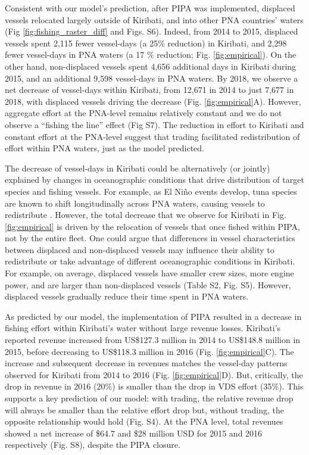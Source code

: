 \documentclass[12pt]{article}
\begin{document}
Consistent with our model's prediction, after PIPA was implemented, displaced vessels relocated largely outside of Kiribati, and into other PNA countries' waters (Fig \ref{fig:fishing_raster_diff} and Figs. S6). Indeed, from 2014 to 2015, displaced vessels spent 2,115 fewer vessel-days (a 25\% reduction) in Kiribati, and 2,298 fewer vessel-days in PNA waters (a 17 \% reduction; Fig. \ref{fig:empirical}). On the other hand, non-displaced vessels spent 4,656 additional days in Kiribati during 2015, and an additional 9,598 vessel-days in PNA waters. By 2018, we observe a net decrease of vessel-days within Kiribati, from 12,671 in 2014 to just 7,677 in 2018, with displaced vessels driving the decrease (Fig. \ref{fig:empirical}A). However, aggregate effort at the PNA-level remains relatively constant and we do not observe a ``fishing the line'' effect (Fig S7). The reduction in effort to Kiribati and constant effort at the PNA-level suggest that trading facilitated redistribution of effort within PNA waters, just as the model predicted.

The decrease of vessel-days in Kiribati could be alternatively (or jointly) explained by changes in oceanographic conditions that drive distribution of target species and fishing vessels. For example, as El Ni\~no events develop, tuna species are known to shift longitudinally across PNA waters, causing vessels to redistribute \cite{aqorau_2018,hanich2018unraveling}. However, the total decrease that we observe for Kiribati in Fig. \ref{fig:empirical} is driven by the relocation of vessels that once fished within PIPA, not by the entire fleet. One could argue that differences in vessel characteristics between displaced and non-displaced vessels may influence their ability to redistribute or take advantage of different oceanographic conditions in Kiribati. For example, on average, displaced vessels have smaller crew sizes, more engine power, and are larger than non-displaced vessels (Table S2, Fig. S5). However, displaced vessels gradually reduce their time spent in PNA waters.

As predicted by our model, the implementation of PIPA resulted in a decrease in fishing effort within Kiribati's water without large revenue losses. Kiribati's reported revenue increased from US\$127.3 million in 2014 to US\$148.8 million in 2015, before decreasing to US\$118.3 million in 2016 (Fig. \ref{fig:empirical}C). The increase and subsequent decrease in revenues matches the vessel-day patterns observed for Kiribati from 2014 to 2016 (Fig. \ref{fig:empirical}D). But, critically, the drop in revenue in 2016 (20\%) is smaller than the drop in VDS effort (35\%). This supports a key prediction of our model: with trading, the relative revenue drop will always be smaller than the relative effort drop but, without trading, the opposite relationship would hold (Fig. S4). At the PNA level, total revenues showed a net increase of \$64.7 and \$28 million USD for 2015 and 2016 respectively (Fig. S8), despite the PIPA closure.
\end{document}
